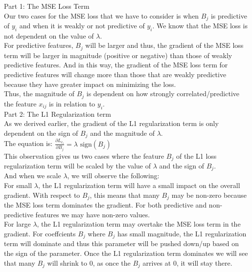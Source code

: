 \documentclass[12pt]{article}
\begin{document}
\begin{enumerate}
\begin{enumerate}
Part 1: The MSE Loss Term \\ 
Our two cases for the MSE loss that we have to consider is when $B_j$ is predictive of $y_i$ and when it is weakly or not predictive of $y_i$.
We know that the MSE loss is not dependent on the value of $\lambda$. \\ 

For predictive features, $B_j$ will be larger and thus, the gradient of the MSE loss term will be larger in magnitude (positive or negative) than those of weakly predictive features. 
And in this way, the gradient of the MSE loss term for predictive features will change more than those that are weakly predictive because they have greater impact on minimizing the loss. \\

Thus, the magnitude of $B_j$ is dependent on how strongly correlated/predictive the feature $x_{ij}$ is in relation to $y_i$.\\

Part 2: The L1 Regularization term \\ 
As we derived earlier, the gradient of the L1 regularization term is only dependent on the sign of $B_j$ and the magnitude of $\lambda$. \\ 

The equation is: $\frac{\partial L_{\ell_1}}{\partial B_j} = \lambda \text{ sign} (B_j) $\\

This observation gives us two cases where the feature $B_j$ of the L1 loss regularization term will be scaled by the value of $\lambda$ and the sign of $B_j$. \\ 
And when we scale $\lambda$, we will observe the following: \\ 
For small $\lambda$, the L1 regularization term will have a small impact on the overall gradient. With respect to $B_j$, this means that many $B_j$ may be non-zero because the MSE loss term dominates the gradient. For both predictive and non-predictive features we may have non-zero values. \\ 
For large $\lambda$, the L1 regularization term may overtake the MSE loss term in the gradient. For coeffcients $B_j$ where $B_j$ has small magnitude, the L1 regularization term will dominate and thus this parameter will be pushed down/up based on the sign of the parameter. Once the L1 regularization term dominates 
we will see that many $B_j$ will shrink to 0, as once the $B_j$ arrives at 0, it will stay there. 



\end{enumerate}
\end{enumerate}
\end{document}
